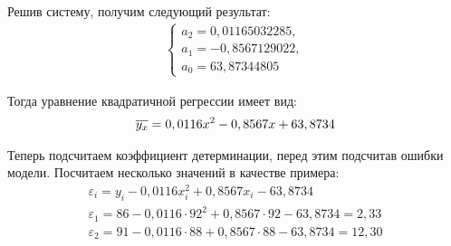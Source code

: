 \documentclass[utf8, a4paper, 14pt, russian, oneside]{book}
\begin{document}
Решив систему, получим следующий результат:
\begin{align*}
    \begin{cases}
        a_2 = 0,01165032285, \\
        a_1 = -0,8567129022, \\
        a_0 = 63,87344805
    \end{cases}
\end{align*}

Тогда уравнение квадратичной регрессии имеет вид:
\begin{align*}
    \overline{ y_x } = 0,0116 x^2 - 0,8567 x + 63,8734
\end{align*}

Теперь подсчитаем коэффициент детерминации, перед этим подсчитав ошибки модели. Посчитаем несколько значений в качестве примера:
\begin{gather*}
    \varepsilon_i = y_i - 0,0116x_i^2 + 0,8567x_i - 63,8734 \\
    \varepsilon_1 = 86 - 0,0116 \cdot 92^2  + 0,8567 \cdot 92 - 63,8734 = 2,33\\
    \varepsilon_2 = 91 - 0,0116 \cdot 88 + 0,8567 \cdot 88 - 63,8734 = 12,30
\end{gather*}

\newpage
\end{document}
